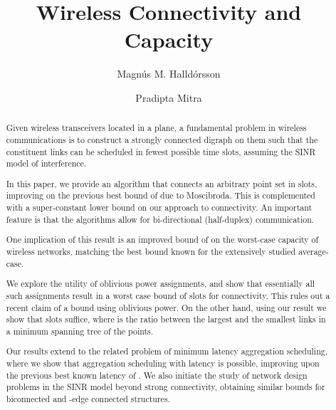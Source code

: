 \documentclass[11pt]{amsart}
\begin{document}
\title{\Large Wireless Connectivity and Capacity}
\author[M. Halld\'orsson]{Magn\'us M. Halld\'orsson}
\address[M. Halld\'orsson]{School of Computer Science\\
Reykjavik University\\
Reykjavik 101, Iceland}

\author[P. Mitra]{Pradipta Mitra}
\address[P. Mitra]{School of Computer Science\\
Reykjavik University\\
Reykjavik 101, Iceland}
\date{}

\maketitle

 


\begin{abstract} \small\baselineskip=9pt
Given  wireless transceivers located in a plane, a fundamental
problem in wireless communications is to construct a strongly
connected digraph on them such that the constituent links can be
scheduled in fewest possible time slots, assuming the SINR model of
interference.

In this paper, we provide an algorithm that connects an arbitrary
point set in  slots, improving on the previous best bound
of  due to Moscibroda.  This is complemented with a
super-constant lower bound on our approach to connectivity.
An important feature is that the algorithms allow for bi-directional
(half-duplex) communication.


One implication of this result is an improved bound of  on the worst-case capacity of wireless networks, matching the best
bound known for the extensively studied average-case.

\iffalse
, measured as the sustained
rate of data aggregation at an information sink, when using a compressible
aggregation function. This matches the best bound known for
\emph{average-case} capacity, which has been extensively studied from
an information theory viewpoint.
\fi

We explore the utility of oblivious power assignments, and show that 
essentially all such assignments result in a worst case bound of
 slots for connectivity.
This rules out a recent claim of a  bound using oblivious power. 
On the other hand, using our result we show that 
 slots suffice, where  is
the ratio between the largest and the smallest links in a minimum spanning tree of the points. 

Our results extend to the related problem of minimum latency
aggregation scheduling, where we show that aggregation scheduling with
 latency is possible, improving upon the previous best
known latency of .
We also initiate the study of network design problems in the SINR
model beyond strong connectivity, obtaining similar bounds 
for biconnected and -edge connected structures.
\end{abstract}
\end{document}
